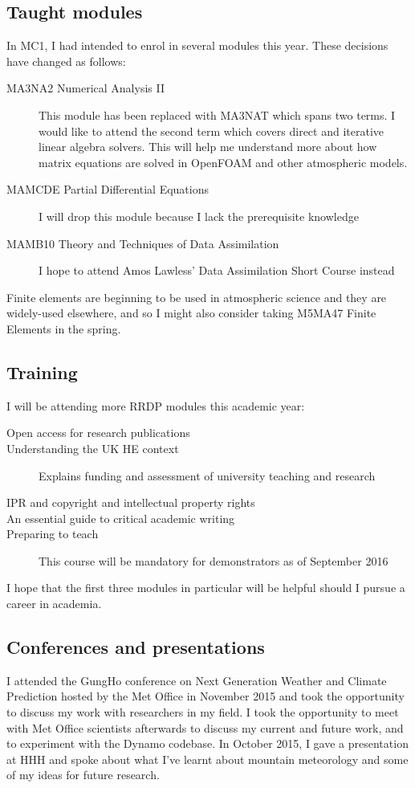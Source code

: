 \documentclass[a4paper]{article}
\begin{document}
\subsection*{Taught modules}
In MC1, I had intended to enrol in several modules this year.  These decisions have changed as follows:
\begin{description}
\item[MA3NA2 Numerical Analysis II]{This module has been replaced with MA3NAT which spans two terms.  I would like to attend the second term which covers direct and iterative linear algebra solvers.  This will help me understand more about how matrix equations are solved in OpenFOAM and other atmospheric models.}
\item[MAMCDE Partial Differential Equations]{I will drop this module because I lack the prerequisite knowledge}
\item[MAMB10 Theory and Techniques of Data Assimilation]{I hope to attend Amos Lawless' Data Assimilation Short Course instead}
\end{description}
Finite elements are beginning to be used in atmospheric science and they are widely-used elsewhere, and so I might also consider taking M5MA47 Finite Elements in the spring.

\subsection*{Training}
I will be attending more RRDP modules this academic year:
\begin{description}
	\item[Open access for research publications]{}
	\item[Understanding the UK HE context]{Explains funding and assessment of university teaching and research}
	\item[IPR and copyright and intellectual property rights]{}
	\item[An essential guide to critical academic writing]{}
	\item[Preparing to teach]{This course will be mandatory for demonstrators as of September 2016}
\end{description}
I hope that the first three modules in particular will be helpful should I pursue a career in academia.

\subsection*{Conferences and presentations}
I attended the GungHo conference on Next Generation Weather and Climate Prediction hosted by the Met Office in November 2015 and took the opportunity to discuss my work with researchers in my field.  I took the opportunity to meet with Met Office scientists afterwards to discuss my current and future work, and to experiment with the Dynamo codebase.  In October 2015, I gave a presentation at HHH and spoke about what I've learnt about mountain meteorology and some of my ideas for future research.
\end{document}
